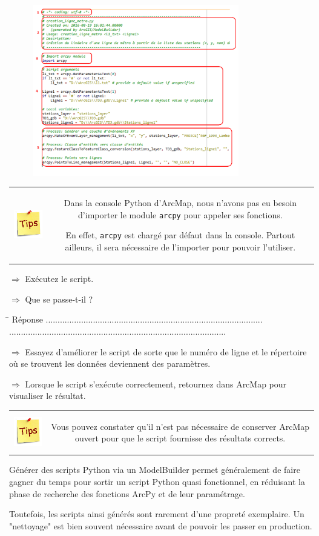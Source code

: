 \documentclass[11pt]{article}
\newcommand{\action}{$\Rightarrow$ }
\newcommand{\reponse}{
	\begin{tabbing}
	\hspace{2cm}\=\kill
	Réponse \> ............................................................................................ \\
 	\> ............................................................................................
	\end{tabbing}
}
\newenvironment{note}{%
	\begin{tabular}[t t]{c c}
		\includegraphics{img/tips.png}
		 &
		\begin{minipage}[c]{0.9\linewidth}
			\begin{sffamily}
}{%
			\end{sffamily}
		\end{minipage}
	\end{tabular}
}
\newcommand{\code}[1]{\lstinline{#1}}
\begin{document}
\begin{figure}[H]
	\center \includegraphics[width=0.8\textwidth]{img/td3/script_arcpy.png}\\
\end{figure}

\begin{note}
Dans la console Python d'ArcMap, nous n'avons pas eu besoin d'importer le module \code{arcpy} pour appeler ses fonctions.

En effet, \code{arcpy} est chargé par défaut dans la console. Partout ailleurs, il sera nécessaire de l'importer pour pouvoir l'utiliser.
\end{note}

\action	Exécutez le script.

\action Que se passe-t-il ?

\reponse

\action Essayez d'améliorer le script de sorte que le numéro de ligne et le répertoire où se trouvent les données deviennent des paramètres.

\action Lorsque le script s'exécute correctement, retournez dans ArcMap pour visualiser le résultat.

\begin{note}
Vous pouvez constater qu'il n'est pas nécessaire de conserver ArcMap ouvert pour que le script fournisse des résultats corrects.
\end{note}

Générer des scripts Python via un ModelBuilder permet généralement de faire gagner du temps pour sortir un script Python quasi fonctionnel, en réduisant la phase de recherche des fonctions ArcPy et de leur paramétrage.

Toutefois, les scripts ainsi générés sont rarement d'une propreté exemplaire. Un "nettoyage" est bien souvent nécessaire avant de pouvoir les passer en production.
\end{document}
